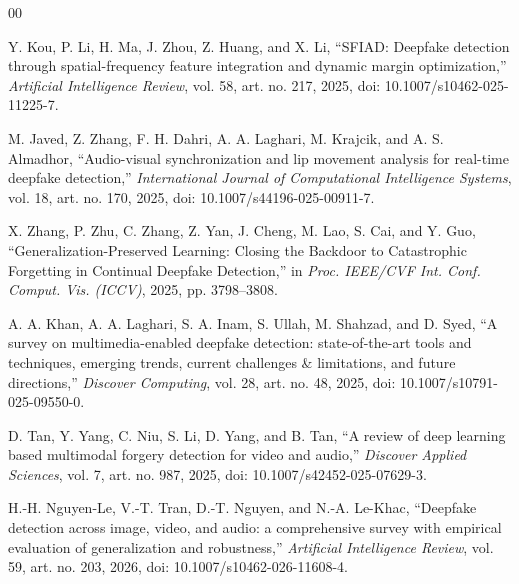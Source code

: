 \documentclass[conference]{IEEEtran}
\begin{document}
\begin{thebibliography}{00}

Y. Kou, P. Li, H. Ma, J. Zhou, Z. Huang, and X. Li,
``SFIAD: Deepfake detection through spatial-frequency feature integration and dynamic margin optimization,''
\textit{Artificial Intelligence Review},
vol. 58, art. no. 217, 2025,
doi: 10.1007/s10462-025-11225-7.

M. Javed, Z. Zhang, F. H. Dahri, A. A. Laghari, M. Krajcik, and A. S. Almadhor,
``Audio-visual synchronization and lip movement analysis for real-time deepfake detection,''
\textit{International Journal of Computational Intelligence Systems},
vol. 18, art. no. 170, 2025,
doi: 10.1007/s44196-025-00911-7.

X. Zhang, P. Zhu, C. Zhang, Z. Yan, J. Cheng, M. Lao, S. Cai, and Y. Guo,
``Generalization-Preserved Learning: Closing the Backdoor to Catastrophic Forgetting in Continual Deepfake Detection,''
in \textit{Proc. IEEE/CVF Int. Conf. Comput. Vis. (ICCV)},
2025, pp. 3798--3808.

A. A. Khan, A. A. Laghari, S. A. Inam, S. Ullah, M. Shahzad, and D. Syed,
``A survey on multimedia-enabled deepfake detection: state-of-the-art tools and techniques, emerging trends, current challenges \& limitations, and future directions,''
\textit{Discover Computing},
vol. 28, art. no. 48, 2025,
doi: 10.1007/s10791-025-09550-0.

D. Tan, Y. Yang, C. Niu, S. Li, D. Yang, and B. Tan,
``A review of deep learning based multimodal forgery detection for video and audio,''
\textit{Discover Applied Sciences},
vol. 7, art. no. 987, 2025,
doi: 10.1007/s42452-025-07629-3.

H.-H. Nguyen-Le, V.-T. Tran, D.-T. Nguyen, and N.-A. Le-Khac,
``Deepfake detection across image, video, and audio: a comprehensive survey with empirical evaluation of generalization and robustness,''
\textit{Artificial Intelligence Review},
vol. 59, art. no. 203, 2026,
doi: 10.1007/s10462-026-11608-4.

\end{thebibliography}
\end{document}
